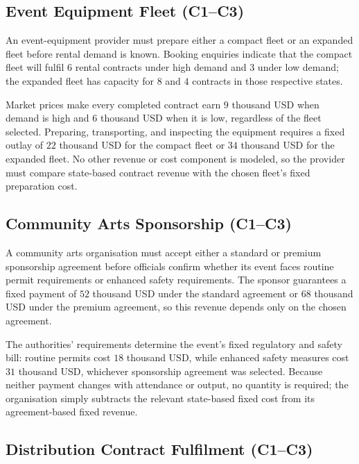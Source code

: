	\subsection{Event Equipment Fleet (C1--C3)}
	\label{sec:problem6-event-equipment-fleet-c1-c3}

	An event-equipment provider must prepare either a compact fleet or an expanded fleet before rental demand is known. Booking enquiries indicate that the compact fleet will fulfil \(6\) rental contracts under high demand and \(3\) under low demand; the expanded fleet has capacity for \(8\) and \(4\) contracts in those respective states.

	Market prices make every completed contract earn \(9\) thousand USD when demand is high and \(6\) thousand USD when it is low, regardless of the fleet selected. Preparing, transporting, and inspecting the equipment requires a fixed outlay of \(22\) thousand USD for the compact fleet or \(34\) thousand USD for the expanded fleet. No other revenue or cost component is modeled, so the provider must compare state-based contract revenue with the chosen fleet's fixed preparation cost.

	\subsection{Community Arts Sponsorship (C1--C3)}
	\label{sec:problem7-community-arts-sponsorship-c1-c3}

	A community arts organisation must accept either a standard or premium sponsorship agreement before officials confirm whether its event faces routine permit requirements or enhanced safety requirements. The sponsor guarantees a fixed payment of \(52\) thousand USD under the standard agreement or \(68\) thousand USD under the premium agreement, so this revenue depends only on the chosen agreement.

	The authorities' requirements determine the event's fixed regulatory and safety bill: routine permits cost \(18\) thousand USD, while enhanced safety measures cost \(31\) thousand USD, whichever sponsorship agreement was selected. Because neither payment changes with attendance or output, no quantity is required; the organisation simply subtracts the relevant state-based fixed cost from its agreement-based fixed revenue.

	\subsection{Distribution Contract Fulfilment (C1--C3)}
	\label{sec:problem8-distribution-contract-fulfilment-c1-c3}

